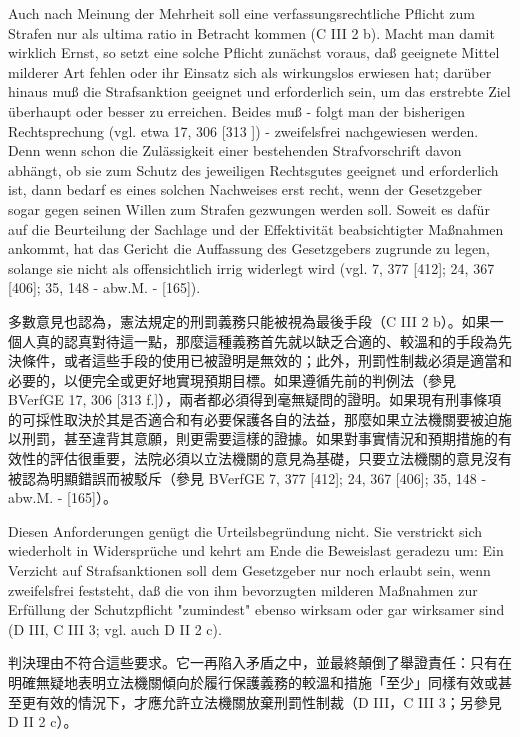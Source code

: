 \documentclass[12pt]{article}
\begin{document}
\syncleft
\begin{sourcepara}
Auch nach Meinung der Mehrheit soll eine verfassungsrechtliche Pflicht zum Strafen nur als ultima ratio in Betracht kommen (C III 2 b). Macht man damit wirklich Ernst, so setzt eine solche Pflicht zunächst voraus, daß geeignete Mittel milderer Art fehlen oder ihr Einsatz sich als wirkungslos erwiesen hat; darüber hinaus muß die Strafsanktion geeignet und erforderlich sein, um das erstrebte Ziel überhaupt oder besser zu erreichen. Beides muß - folgt man der bisherigen Rechtsprechung (vgl. etwa \abbrBVerfGE{} 17, 306 [313 \abbrF{}]) - zweifelsfrei nachgewiesen werden. Denn wenn schon die Zulässigkeit einer bestehenden Strafvorschrift davon abhängt, ob sie zum Schutz des jeweiligen Rechtsgutes geeignet und erforderlich ist, dann bedarf es eines solchen Nachweises erst recht, wenn der Gesetzgeber sogar gegen seinen Willen zum Strafen gezwungen werden soll. Soweit es dafür auf die Beurteilung der Sachlage und der Effektivität beabsichtigter Maßnahmen ankommt, hat das Gericht die Auffassung des Gesetzgebers zugrunde zu legen, solange sie nicht als offensichtlich irrig widerlegt wird (vgl. \abbrBVerfGE{} 7, 377 [412]; 24, 367 [406]; 35, 148 - abw.M. - [165]).
\end{sourcepara}
\begin{transpara}
多數意見也認為，憲法規定的刑罰義務只能被視為最後手段（C III 2 b）。如果一個人真的認真對待這一點，那麼這種義務首先就以缺乏合適的、較溫和的手段為先決條件，或者這些手段的使用已被證明是無效的；此外，刑罰性制裁必須是適當和必要的，以便完全或更好地實現預期目標。如果遵循先前的判例法（參見 BVerfGE 17, 306 [313 f.]），兩者都必須得到毫無疑問的證明。如果現有刑事條項的可採性取決於其是否適合和有必要保護各自的法益，那麼如果立法機關要被迫施以刑罰，甚至違背其意願，則更需要這樣的證據。如果對事實情況和預期措施的有效性的評估很重要，法院必須以立法機關的意見為基礎，只要立法機關的意見沒有被認為明顯錯誤而被駁斥（參見 BVerfGE 7, 377 [412]; 24, 367 [406]; 35, 148 - abw.M. - [165]）。
\end{transpara}

\syncleft
\begin{sourcepara}
Diesen Anforderungen genügt die Urteilsbegründung nicht. Sie verstrickt sich wiederholt in Widersprüche und kehrt am Ende die Beweislast geradezu um: Ein Verzicht auf Strafsanktionen soll dem Gesetzgeber nur noch erlaubt sein, wenn zweifelsfrei feststeht, daß die von ihm bevorzugten milderen Maßnahmen zur Erfüllung der Schutzpflicht "zumindest" ebenso wirksam oder gar wirksamer sind (D III, C III 3; vgl. auch D II 2 c).
\end{sourcepara}
\begin{transpara}
判決理由不符合這些要求。它一再陷入矛盾之中，並最終顛倒了舉證責任：只有在明確無疑地表明立法機關傾向於履行保護義務的較溫和措施「至少」同樣有效或甚至更有效的情況下，才應允許立法機關放棄刑罰性制裁（D III，C III 3；另參見D II 2 c）。
\end{transpara}
\end{document}
